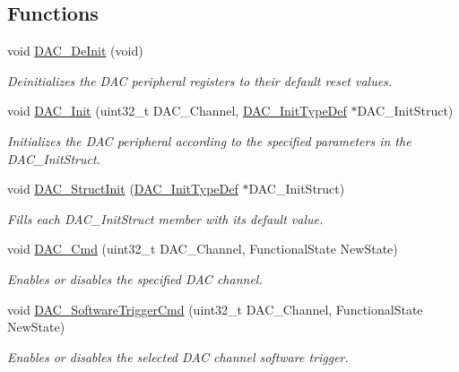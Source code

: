 \subsection*{Functions}
\begin{DoxyCompactItemize}
\item 
void \hyperlink{group___d_a_c_ga1fae225204e1e049d6795319e99ba8bc}{D\-A\-C\-\_\-\-De\-Init} (void)
\begin{DoxyCompactList}\small\item\em Deinitializes the D\-A\-C peripheral registers to their default reset values. \end{DoxyCompactList}\item 
void \hyperlink{group___d_a_c_ga7c59850468ed4bf0659663fe495441da}{D\-A\-C\-\_\-\-Init} (uint32\-\_\-t D\-A\-C\-\_\-\-Channel, \hyperlink{struct_d_a_c___init_type_def}{D\-A\-C\-\_\-\-Init\-Type\-Def} $\ast$D\-A\-C\-\_\-\-Init\-Struct)
\begin{DoxyCompactList}\small\item\em Initializes the D\-A\-C peripheral according to the specified parameters in the D\-A\-C\-\_\-\-Init\-Struct. \end{DoxyCompactList}\item 
void \hyperlink{group___d_a_c_gadfc270974d54cb5fa5f92556015c4046}{D\-A\-C\-\_\-\-Struct\-Init} (\hyperlink{struct_d_a_c___init_type_def}{D\-A\-C\-\_\-\-Init\-Type\-Def} $\ast$D\-A\-C\-\_\-\-Init\-Struct)
\begin{DoxyCompactList}\small\item\em Fills each D\-A\-C\-\_\-\-Init\-Struct member with its default value. \end{DoxyCompactList}\item 
void \hyperlink{group___d_a_c_ga323e61530d7fa9396c3bce9edb61f733}{D\-A\-C\-\_\-\-Cmd} (uint32\-\_\-t D\-A\-C\-\_\-\-Channel, Functional\-State New\-State)
\begin{DoxyCompactList}\small\item\em Enables or disables the specified D\-A\-C channel. \end{DoxyCompactList}\item 
void \hyperlink{group___d_a_c_ga46f9f7f6b9520a86e300fe966afe5fb3}{D\-A\-C\-\_\-\-Software\-Trigger\-Cmd} (uint32\-\_\-t D\-A\-C\-\_\-\-Channel, Functional\-State New\-State)
\begin{DoxyCompactList}\small\item\em Enables or disables the selected D\-A\-C channel software trigger. \end{DoxyCompactList}\item 

\end{DoxyCompactItemize}
